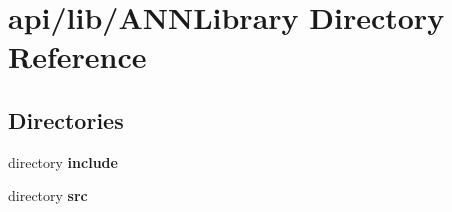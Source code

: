 \section{api/lib/\+A\+N\+N\+Library Directory Reference}
\label{dir_0315d941a9fb2690c54a4156d2eb423a}
\subsection*{Directories}
\begin{DoxyCompactItemize}
\item 
directory {\bf include}
\item 
directory {\bf src}
\end{DoxyCompactItemize}
